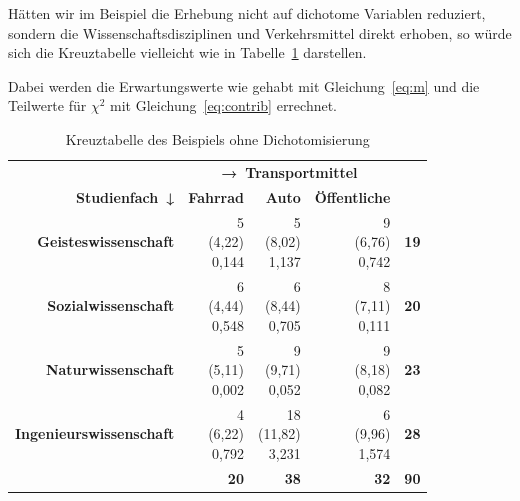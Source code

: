 \documentclass[
  11pt,
  ngerman,
  a4paper,
]{report}
\begin{document}
Hätten wir im Beispiel die Erhebung nicht auf dichotome Variablen reduziert, sondern die Wissenschaftsdisziplinen und Verkehrsmittel direkt erhoben, so würde sich die Kreuztabelle vielleicht wie in Tabelle~\ref{tab:ci} darstellen.

Dabei werden die Erwartungswerte wie gehabt mit Gleichung~\eqref{eq:m} und die Teilwerte für \(\chi^2\) mit Gleichung~\eqref{eq:contrib} errechnet.

\begin{table}

\caption{\label{tab:ci}Kreuztabelle des Beispiels ohne Dichotomisierung}
\centering
\begin{tabular}[t]{>{}r|rr>{}r|>{}r}
\toprule
\multicolumn{1}{c}{\textbf{ }} & \multicolumn{3}{c}{\textbf{→ Transportmittel}} & \multicolumn{1}{c}{\textbf{ }} \\
\cmidrule(l{3pt}r{3pt}){2-4}
\textbf{Studienfach ↓} & \textbf{Fahrrad} & \textbf{Auto} & \textbf{Öffentliche} & \textbf{  }\\
\midrule
\textbf{Geisteswissenschaft} & \makecell[tr]{5\\(4,22)\\\textcolor{goethe_blue}{0,144}} & \makecell[tr]{5\\(8,02)\\\textcolor{goethe_blue}{1,137}} & \makecell[tr]{9\\(6,76)\\\textcolor{goethe_blue}{0,742}} & \textbf{19}\\
\textbf{Sozialwissenschaft} & \makecell[tr]{6\\(4,44)\\\textcolor{goethe_blue}{0,548}} & \makecell[tr]{6\\(8,44)\\\textcolor{goethe_blue}{0,705}} & \makecell[tr]{8\\(7,11)\\\textcolor{goethe_blue}{0,111}} & \textbf{20}\\
\textbf{Naturwissenschaft} & \makecell[tr]{5\\(5,11)\\\textcolor{goethe_blue}{0,002}} & \makecell[tr]{9\\(9,71)\\\textcolor{goethe_blue}{0,052}} & \makecell[tr]{9\\(8,18)\\\textcolor{goethe_blue}{0,082}} & \textbf{23}\\
\textbf{Ingenieurswissenschaft} & \makecell[tr]{4\\(6,22)\\\textcolor{goethe_blue}{0,792}} & \makecell[tr]{18\\(11,82)\\\textcolor{goethe_blue}{3,231}} & \makecell[tr]{6\\(9,96)\\\textcolor{goethe_blue}{1,574}} & \textbf{28}\\
\midrule
\textbf{\textbf{}} & \textbf{20} & \textbf{38} & \textbf{32} & \textbf{\textbf{90}}\\
\bottomrule
\end{tabular}
\end{table}
\end{document}
